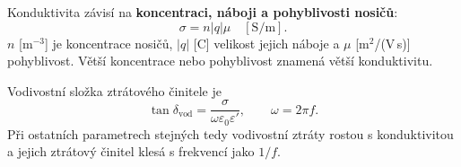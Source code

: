 Konduktivita závisí na \textbf{koncentraci, náboji a pohyblivosti nosičů}:
\[\boxed{\sigma=n|q|\mu}\quad[\mathrm{S/m}].\]
$n$ [m$^{-3}$] je koncentrace nosičů, $|q|$ [C] velikost jejich náboje a $\mu$ [m$^2$/(V\,s)] pohyblivost. Větší koncentrace nebo pohyblivost znamená větší konduktivitu.

Vodivostní složka ztrátového činitele je
\[\tan\delta_{\mathrm{vod}}=\frac{\sigma}{\omega\varepsilon_0\varepsilon'},\qquad\omega=2\pi f.\]
Při ostatních parametrech stejných tedy vodivostní ztráty rostou s konduktivitou a jejich ztrátový činitel klesá s frekvencí jako $1/f$.
